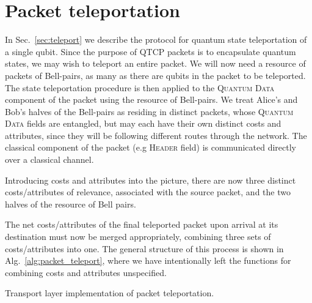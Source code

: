 \documentclass[aps,rmp,twocolumn,amsmath,amssymb,nofootinbib,superscriptaddress,longbibliography,floatfix,table-of-contents,eqsecnum]{revtex4-1}
\begin{document}
\section{Packet teleportation} 

In Sec.~\ref{sec:teleport} we describe the protocol for quantum state teleportation of a single qubit. Since the purpose of QTCP packets is to encapsulate quantum states, we may wish to teleport an entire packet. We will now need a resource of packets of Bell-pairs, as many as there are qubits in the packet to be teleported. The state teleportation procedure is then applied to the \textsc{Quantum Data} component of the packet using the resource of Bell-pairs. We treat Alice's and Bob's halves of the Bell-pairs as residing in distinct packets, whose \textsc{Quantum Data} fields are entangled, but may each have their own distinct costs and attributes, since they will be following different routes through the network. The classical component of the packet (e.g \textsc{Header} field) is communicated directly over a classical channel.

Introducing costs and attributes into the picture, there are now three distinct costs/attributes of relevance, associated with the source packet, and the two halves of the resource of Bell pairs.

The net costs/attributes of the final teleported packet upon arrival at its destination must now be merged appropriately, combining three sets of costs/attributes into one. The general structure of this process is shown in Alg.~\ref{alg:packet_teleport}, where we have intentionally left the functions for combining costs and attributes unspecified.

\begin{table}[!htb]
\caption{Transport layer implementation of packet teleportation.} \label{alg:packet_teleport}
\end{table}
\end{document}

